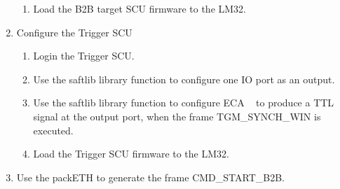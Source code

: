 \begin{enumerate}
\begin{enumerate}
	\item Load the B2B target SCU firmware to the LM32.
    \end{enumerate}
  \item Configure the Trigger SCU
    \begin{enumerate}
    \item Login the Trigger SCU.
	\item Use the saftlib library function to configure one IO port as an output. 
	\item Use the saftlib library function to configure ECA ~\cite{terpstra_timing_2013} to produce a TTL signal at the output port, when the frame TGM\_SYNCH\_WIN is executed. 
	\item Load the Trigger SCU firmware to the LM32.
    \end{enumerate}
	\item Use the packETH to generate the frame CMD\_START\_B2B.
\end{enumerate}



